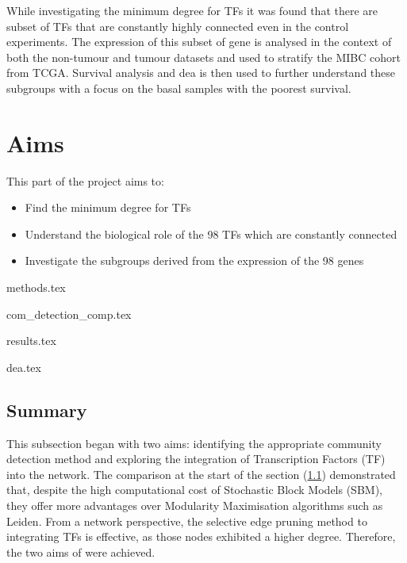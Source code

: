 While investigating the minimum degree for TFs it was found that there are subset of TFs that are constantly highly connected even in the control experiments. The expression of this subset of gene is analysed in the context of both the non-tumour and tumour datasets and used to stratify the MIBC cohort from TCGA. Survival analysis and \acrfull{dea} is then used to further understand these subgroups with a focus on the basal samples with the poorest survival.

% 

\section{Aims}

This part of the project aims to:
\begin{itemize}
    \item Find the minimum degree for TFs
    \item Understand the biological role of the 98 TFs which are constantly connected
    \item Investigate the subgroups derived from the expression of the 98 genes
\end{itemize}


{methods.tex}

{com_detection_comp.tex}

{results.tex}

{dea.tex}


\subsection{Summary}

This subsection began with two aims: identifying the appropriate community detection method and exploring the integration of Transcription Factors (TF) into the network. The comparison at the start of the section (\ref{}) demonstrated that, despite the high computational cost of Stochastic Block Models (SBM), they offer more advantages over Modularity Maximisation algorithms such as Leiden. From a network perspective, the selective edge pruning method to integrating TFs is effective, as those nodes exhibited a higher degree. Therefore, the two aims of were achieved.

